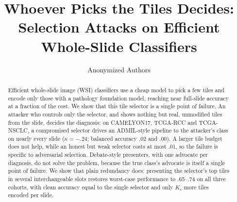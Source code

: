 \documentclass[runningheads]{llncs}
\begin{document}
\title{Whoever Picks the Tiles Decides: Selection Attacks on Efficient Whole-Slide Classifiers}
\author{Anonymized Authors}
\maketitle

\begin{abstract}
Efficient whole-slide image (WSI) classifiers use a cheap model to pick a few tiles and encode only those with a pathology foundation model, reaching near full-slide accuracy at a fraction of the cost. We show that this tile selector is a single point of failure. An attacker who controls only the selector, and shows nothing but real, unmodified tiles from the slide, decides the diagnosis: on CAMELYON17, TCGA-RCC and TCGA-NSCLC, a compromised selector drives an ADMIL-style pipeline to the attacker's class on nearly every slide ($\kappa=-.24$; balanced accuracy .02 and .00). A larger tile budget does not help, while an honest but weak selector costs at most .01, so the failure is specific to adversarial selection. Debate-style presenters, with one advocate per diagnosis, do not solve the problem, because the true class's advocate is itself a single point of failure. We show that plain redundancy does: presenting the selector's top tiles in several interchangeable slots restores worst-case performance to .65--.74 on all three cohorts, with clean accuracy equal to the single selector and only $K_c$ more tiles encoded per slide.
\end{abstract}

\end{document}
